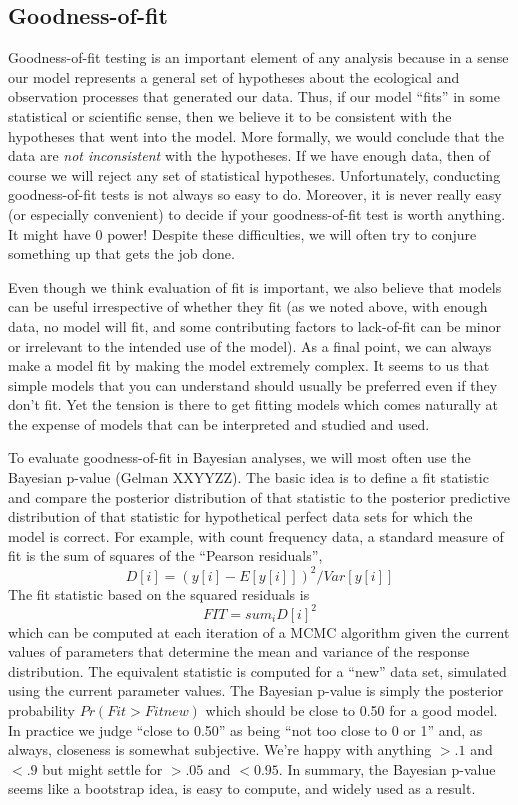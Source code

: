 \subsection{Goodness-of-fit}
 Goodness-of-fit testing is an important element of any analysis because in a sense our model represents a general set of hypotheses about the ecological and observation processes that generated our data. Thus, if our model ``fits'' in some statistical or scientific sense, then we believe it to be consistent with the hypotheses that went into the model. More formally, we would conclude that the data are {\it not inconsistent} with the hypotheses. If we have enough data, then of course we will reject any set of statistical hypotheses.  Unfortunately, conducting goodness-of-fit tests is not always so easy to do. Moreover, it is never really easy (or especially convenient) to decide if your goodness-of-fit test is worth anything. It might have 0 power!  Despite these difficulties, we will often try to conjure something up that gets the job done. 

 Even though we think evaluation of fit is important, we also believe that models can be useful irrespective of whether they fit (as we noted above, with enough data, no model will fit, and some contributing factors to lack-of-fit can be minor or irrelevant to the intended use of the model). As a final point, we can always make a model fit by making the model extremely complex. It seems to us that simple models that you can understand should usually be preferred even if they don't fit. Yet the tension is there to get fitting models which comes naturally at the expense of models that can be interpreted and studied and used.  

To evaluate goodness-of-fit in Bayesian analyses, we will most often  use the Bayesian p-value (Gelman XXYYZZ).  The basic idea is to define a fit statistic and compare the posterior distribution of that statistic to the posterior predictive distribution of that statistic for hypothetical perfect data sets for which the model is correct. For example, with count frequency data, a standard measure of fit is the sum of squares of the ``Pearson residuals'',
\[
D[i] = (y[i] - E[y[i]])^{2}/Var[ y[i] ]
\]
The fit statistic based on the squared residuals is
\[
FIT = sum_{i} D[i]^{2}
\]
which can be computed at each iteration of a MCMC algorithm given the
current values of parameters that determine the mean and variance of
the response distribution.  The equivalent statistic is computed for a
``new'' data set, simulated using the current parameter values. The
Bayesian p-value is simply the posterior probability $Pr(Fit >
Fitnew)$ which should be close to 0.50 for a good model. In practice
we judge ``close to 0.50'' as being ``not too close to 0 or 1'' and, as always, closeness is somewhat subjective. We're happy with anything $>.1$ and $<.9$ but might settle for $>.05$ and $<0.95$. In summary, the Bayesian p-value seems like a bootstrap idea, is easy to compute, and widely used as a result.

